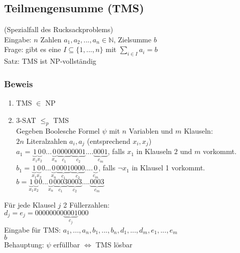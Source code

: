 \subsection{Teilmengensumme (TMS)}
(Spezialfall des Rucksackproblems)\\
Eingabe: $n$ Zahlen $a_1,a_2,...,a_n \in \mathbb{N}$, Zielsumme $b$\\
Frage: gibt es eine $I \subseteq \{1,...,n\}$ mit $\sum_{i \in I}^{} a_i = b$\\
Satz: TMS ist NP-vollständig\\
\subsubsection{Beweis}
\begin{enumerate}
\item TMS $\in$ NP \checkmark
\item 3-SAT $\leq_p$ TMS\\
Gegeben Boolesche Formel $\psi$ mit $n$ Variablen und $m$ Klauseln:\\
$2n$ Literalzahlen $a_i,a_j$ (entsprechend $x_i,x_j$)\\
$a_1 = \underbrace{1}_{x_1}\underbrace{0}_{x_2}0...\underbrace{0}_{x_n}\underbrace{0000}_{c_1}\underbrace{0001}_{c_2}....\underbrace{0001}_{c_m}$, falls $x_1$ in Klauseln $2$ und $m$ vorkommt.\\
$b_1 = \underbrace{1}_{x_1}\underbrace{0}_{x_2}0...\underbrace{0}_{x_n}\underbrace{0001}_{c_1}\underbrace{0000}_{c_2}....\underbrace{0}_{c_m}$, falls $\lnot x_1$ in Klausel 1 vorkommt.\\
$b = \underbrace{1}_{x_1}\underbrace{0}_{x_2}0...\underbrace{0}_{x_n}\underbrace{0003}_{c_1}\underbrace{0003}_{c_2}....\underbrace{0003}_{c_m}$
\end{enumerate}
Für jede Klausel $j$ 2 Füllerzahlen:\\
$d_j=e_j=00000000\underbrace{0001}_{c_j}000$\\
Eingabe für TMS: $a_1,...,a_n,b_1,...,b_n,d_1,...,d_m,e_1,...,e_m$\\
$b$\\
Behauptung: $\psi$ erfüllbar $\Leftrightarrow$ TMS lösbar
